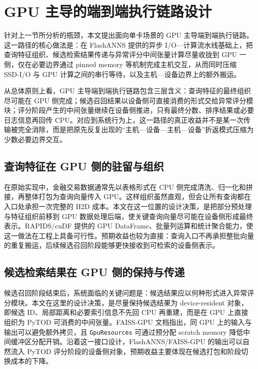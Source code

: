 \section{GPU 主导的端到端执行链路设计}

针对上一节所分析的瓶颈，本文提出面向单卡场景的 GPU 主导端到端执行链路。这一路径的核心做法是：在 FlashANNS 提供的异步 I/O---计算流水线基础上，把查询特征组织、候选检索结果传递与异常评分中间张量计算尽量收拢到 GPU 一侧，仅在必要边界通过 pinned memory 等机制完成主机交互，从而同时压缩 SSD-I/O 与 GPU 计算之间的串行等待，以及主机---设备边界上的额外搬运。

从总体原则上看，GPU 主导端到端执行链路包含三层含义：查询特征的最终组织尽可能在 GPU 侧完成；候选召回结果以设备侧可直接消费的形式交给异常评分模块；评分阶段产生的中间张量继续在设备侧推进，只有最终分数、排序结果或必要日志信息再回传 CPU。对应到系统行为上，这一路径的真正收益并不是某一次传输被完全消除，而是把原先反复出现的``主机---设备---主机---设备''折返模式压缩为少数必要边界交互。

\subsection{查询特征在 GPU 侧的驻留与组织}

在原始实现中，金融交易数据通常先以表格形式在 CPU 侧完成清洗、归一化和拼接，再整体打包为查询向量传入 GPU。这样组织虽然直观，但会让所有查询都在入口处承担一次完整的 H2D 成本。本文在这一位置的设计决策，是把部分预处理与特征组织前移到 GPU 数据处理后端，使关键查询向量尽可能在设备侧形成最终表示。RAPIDS/cuDF 提供的 GPU DataFrame、批量列运算和统计聚合能力，使这一做法在工程上具备可行性\citep{rapids_cudf_pandas}。预期收益也较为直接：查询入口不再承担整批向量的重复搬运，后续候选召回阶段能够更快接收到可检索的设备侧表示。

\subsection{候选检索结果在 GPU 侧的保持与传递}

候选召回阶段结束后，系统面临的关键问题是：候选结果应以何种形式进入异常评分模块。本文在这里的设计决策，是尽量保持候选结果为 device-resident 对象，即候选 ID、局部距离和必要索引信息不先回 CPU 再重建，而是在 GPU 上直接组织为 PyTOD 可消费的中间张量。FAISS-GPU 文档指出，同 GPU 上的输入与输出可以避免额外拷贝，且 \texttt{GpuResources} 可通过预分配 scratch memory 降低中间缓冲区分配开销\citep{faiss_gpu_wiki}。沿着这一接口设计，FlashANNS/FAISS-GPU 的输出可以自然流入 PyTOD 评分阶段的设备侧对象，预期收益主要体现在候选打包和阶段切换成本的下降。

